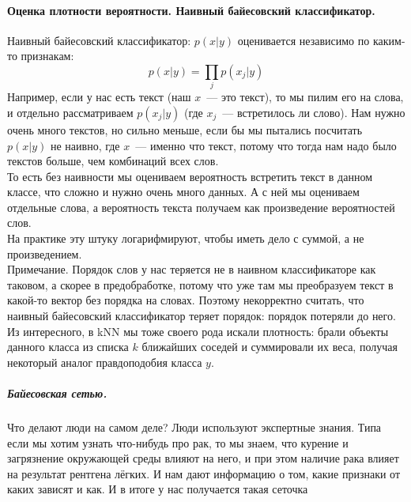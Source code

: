 \documentclass{article}
\begin{document}
    \paragraph{Оценка плотности вероятности. Наивный байесовский классификатор.}
    Наивный байесовский классификатор: $p(x|y)$ оценивается независимо по каким-то признакам:
    \[p(x|y)=\prod\limits_jp(x_j|y)\]
    Например, если у нас есть текст (наш $x$~--- это текст), то мы пилим его на слова, и отдельно рассматриваем $p(x_j|y)$ (где $x_j$~--- встретилось ли слово). Нам нужно очень много текстов, но сильно меньше, если бы мы пытались посчитать $p(x|y)$ не наивно, где $x$~--- именно что текст, потому что тогда нам надо было текстов больше, чем комбинаций всех слов.\\
    То есть без наивности мы оцениваем вероятность встретить текст в данном классе, что сложно и нужно очень много данных. А с ней мы оцениваем отдельные слова, а вероятность текста получаем как произведение вероятностей слов.\\
    На практике эту штуку логарифмируют, чтобы иметь дело с суммой, а не произведением.\\
    Примечание. Порядок слов у нас теряется не в наивном классификаторе как таковом, а скорее в предобработке, потому что уже там мы преобразуем текст в какой-то вектор без порядка на словах. Поэтому некорректно считать, что наивный байесовский классификатор теряет порядок: порядок потеряли до него.\\
    Из интересного, в kNN мы тоже своего рода искали плотность: брали объекты данного класса из списка $k$ ближайших соседей и суммировали их веса, получая некоторый аналог правдоподобия класса $y$.
    \subparagraph{Байесовская сетью.}
    Что делают люди на самом деле? Люди используют экспертные знания. Типа если мы хотим узнать что-нибудь про рак, то мы знаем, что курение и загрязнение окружающей среды влияют на него, и при этом наличие рака влияет на результат рентгена лёгких. И нам дают информацию о том, какие признаки от каких зависят и как. И в итоге у нас получается такая сеточка
    \begin{figure}[H]
    \end{figure}\noindent
\end{document}
